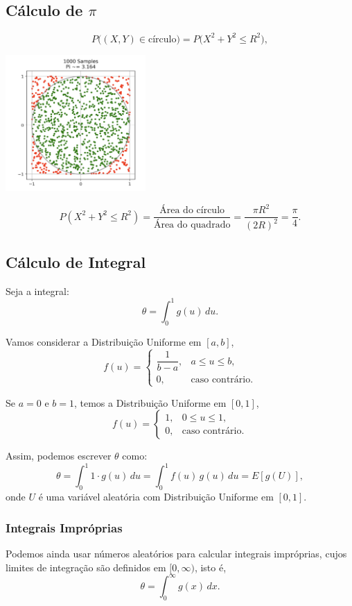 \documentclass{article}
\begin{document}
\subsection{Cálculo de $\pi$}
    $$
    P\big((X, Y) \in \text{círculo}\big) = P\big(X^2 + Y^2 \le R^2\big),
    $$

    \begin{center}
        \includegraphics[width=0.4\textwidth]{figuras/monte_carlo_calculo_pi.png}
    \end{center}

    $$
    P(X^2 + Y^2 \le R^2) =
    \frac{\text{Área do círculo}}{\text{Área do quadrado}} =
    \frac{\pi R^2}{(2R)^2} = \frac{\pi}{4}.
    $$

\subsection{Cálculo de Integral}
Seja a integral:
    $$
    \theta = \int_{0}^{1} g(u)\, du.
    $$

Vamos considerar a Distribuição Uniforme em $[a,b]$,
    $$
    f(u) =
    \begin{cases}
    \dfrac{1}{b-a}, & a \le u \le b,\\[6pt]
    0, & \text{caso contrário.}
    \end{cases}
    $$
    
Se $a=0$ e $b=1$, temos a Distribuição Uniforme em $[0,1]$,
    $$
    f(u) =
    \begin{cases}
    1, & 0 \le u \le 1,\\
    0, & \text{caso contrário.}
    \end{cases}
    $$
    
Assim, podemos escrever $\theta$ como:
    $$
    \theta = \int_{0}^{1} 1 \cdot g(u)\, du
    = \int_{0}^{1} f(u)\, g(u)\, du
    = E[g(U)],
    $$
onde $U$ é uma variável aleatória com Distribuição Uniforme em $[0,1]$.

\subsubsection{Integrais Impróprias}
Podemos ainda usar números aleatórios para calcular integrais impróprias, cujos limites de integração são definidos em $[0, \infty)$, isto é,
    $$
    \theta = \int_{0}^{\infty} g(x)\, dx.
    $$
\end{document}
